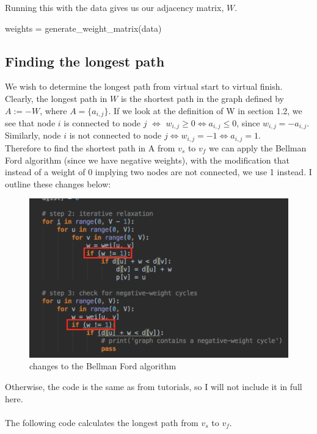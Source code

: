 \documentclass[paper=a4, fontsize=12pt]{scrartcl} %
\numberwithin{equation}{section}       %
\numberwithin{figure}{section}         %
\numberwithin{table}{section}          %
\begin{document}
Running this with the data gives us our adjacency matrix, $W$.

\begin{python}
weights = generate_weight_matrix(data)
\end{python}

\subsection{Finding the longest path}

We wish to determine the longest path from virtual start to virtual finish. Clearly, the longest path in $W$ is the shortest path in the graph defined by $A:=-W$, where $A = \{a_{i,j} \}$. If we look at the definition of W in section 1.2, we see that node $i$ is connected to node $j$ $\iff$ $w_{i,j} \geq 0 \iff a_{i,j} \leq 0$, since $w_{i,j} = -a_{i,j}$. Similarly, node $i$ is not connected to node $j \iff w_{i,j} = -1 \iff a_{i,j} = 1$. \\
Therefore to find the shortest path in A from $v_{s}$ to $v_{f}$ we can apply the Bellman Ford algorithm (since we have negative weights), with the modification that instead of a weight of 0 implying two nodes are not connected, we use 1 instead. I outline these changes below:

\begin{figure}[h]
\caption{changes to the Bellman Ford algorithm}
\centering
\includegraphics{changes}
\end{figure}

Otherwise, the code is the same as from tutorials, so I will not include it in full here.\\ \\
The following code calculates the longest path from $v_{s}$ to $v_{f}$.
\end{document}
